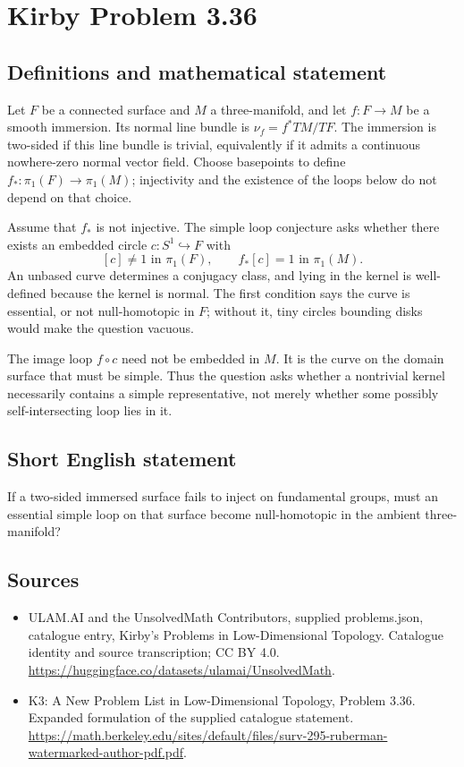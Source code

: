 \documentclass[11pt,a4paper]{article}
\begin{document}
\section*{Kirby Problem 3.36}\label{statement}

\subsection{Definitions and mathematical statement}
Let $F$ be a connected surface and $M$ a three-manifold, and let
$f:F\to M$ be a smooth immersion. Its normal line bundle is
$\nu_f=f^*TM/TF$. The immersion is two-sided if this line bundle is trivial,
equivalently if it admits a continuous nowhere-zero normal vector field.
Choose basepoints to define $f_*:\pi_1(F)\to\pi_1(M)$; injectivity and the
existence of the loops below do not depend on that choice.

Assume that $f_*$ is not injective. The simple loop conjecture asks whether
there exists an embedded circle $c:S^1\hookrightarrow F$ with
\[
 [c]\ne1\text{ in }\pi_1(F),\qquad
 f_*[c]=1\text{ in }\pi_1(M).
\]
An unbased curve determines a conjugacy class, and lying in the kernel is
well-defined because the kernel is normal. The first condition says the
curve is essential, or not null-homotopic in $F$; without it, tiny circles
bounding disks would make the question vacuous.

The image loop $f\circ c$ need not be embedded in $M$. It is the curve on
the domain surface that must be simple. Thus the question asks whether a
nontrivial kernel necessarily contains a simple representative, not merely
whether some possibly self-intersecting loop lies in it.
\subsection{Short English statement}
If a two-sided immersed surface fails to inject on fundamental groups, must an essential simple loop on that surface become null-homotopic in the ambient three-manifold?
\subsection{Sources}
\begin{itemize}
\item[S1] ULAM.AI and the UnsolvedMath Contributors, supplied problems.json, catalogue entry, Kirby's Problems in Low-Dimensional Topology. Catalogue identity and source transcription; CC BY 4.0.
\url{https://huggingface.co/datasets/ulamai/UnsolvedMath}.
\item[S2] K3: A New Problem List in Low-Dimensional Topology, Problem 3.36. Expanded formulation of the supplied catalogue statement.
\url{https://math.berkeley.edu/sites/default/files/surv-295-ruberman-watermarked-author-pdf.pdf}.
\end{itemize}
\end{document}
